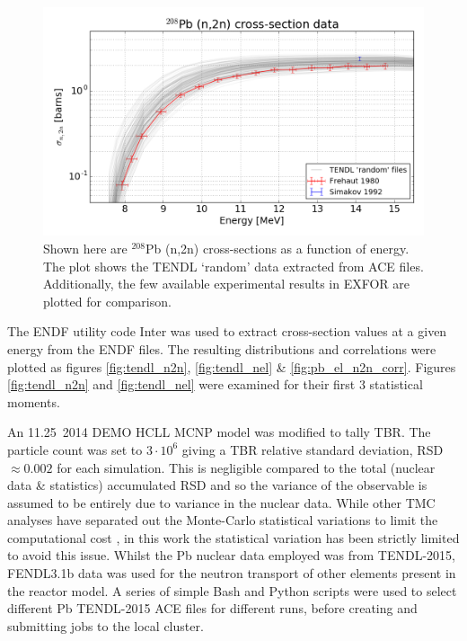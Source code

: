 \begin{figure}
  \centering
  \includegraphics[width=\textwidth]{pb208_n2n_tendl_exfor.png}
  \caption{Shown here are $^{208}$Pb (n,2n) cross-sections as a function of energy. The plot shows the TENDL `random' data extracted from ACE files. Additionally, the few available experimental results in EXFOR are plotted for comparison.}
  \label{fig:tendl_lead}
\end{figure}

The ENDF utility code Inter was used to extract cross-section values at a given energy from the ENDF files. The resulting distributions and correlations were plotted as figures \ref{fig:tendl_n2n}, \ref{fig:tendl_nel} \& \ref{fig:pb_el_n2n_corr}. Figures \ref{fig:tendl_n2n} and \ref{fig:tendl_nel} were examined for their first 3 statistical moments. 

An 11.25\degree \ 2014 DEMO HCLL MCNP model was modified to tally TBR. The particle count was set to $3\cdot10^{6}$ giving a TBR relative standard deviation, RSD $\approx 0.002$ for each simulation. This is negligible compared to the total (nuclear data \& statistics) accumulated RSD and so the variance of the observable is assumed to be entirely due to variance in the nuclear data. While other TMC analyses have separated out the Monte-Carlo statistical variations to limit the computational cost \cite{Rochman2014a}, in this work the statistical variation has been strictly limited to avoid this issue. Whilst the Pb nuclear data employed was from TENDL-2015, FENDL3.1b data was used for the neutron transport of other elements present in the reactor model. A series of simple Bash and Python scripts were used to select different Pb TENDL-2015 ACE files for different runs, before creating and submitting jobs to the local cluster.


